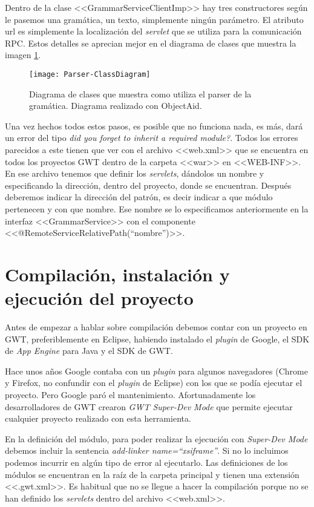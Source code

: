 Dentro de la clase <<GrammarServiceClientImp>> hay tres constructores según le pasemos una gramática, un texto, simplemente ningún parámetro. El atributo url es simplemente la localización del \emph{servlet} que se utiliza para la comunicación RPC. Estos detalles se aprecian mejor en el diagrama de clases que muestra la imagen \ref{fig:5.3}.

\begin{figure}
\centering
\texttt{[image: Parser-ClassDiagram]}
\caption{Diagrama de clases que muestra como utiliza el parser de la gramática. Diagrama realizado con ObjectAid.}
\label{fig:5.3}
\end{figure}

Una vez hechos todos estos pasos, es posible que no funciona nada, es más, dará un error del tipo \textit{\emph{did you forget to inherit a required module?}}. Todos los errores parecidos a este tienen que ver con el archivo <<web.xml>> que se encuentra en todos los proyectos GWT dentro de la carpeta <<war>> en <<WEB-INF>>. En ese archivo tenemos que definir los \emph{servlets}, dándolos un nombre y especificando la dirección, dentro del proyecto, donde se encuentran. Después deberemos indicar la dirección del patrón, es decir indicar a que módulo pertenecen y con que nombre. Ese nombre se lo especificamos anteriormente en la interfaz <<GrammarService>> con el componente <<@RemoteServiceRelativePath(``nombre'')>>.

\section{Compilación, instalación y ejecución del proyecto}

Antes de empezar a hablar sobre compilación debemos contar con un proyecto en GWT, preferiblemente en Eclipse, habiendo instalado el \emph{plugin} de Google, el SDK de \emph{App Engine} para Java y el SDK de GWT.

Hace unos años Google contaba con un \emph{plugin} para algunos navegadores (Chrome y Firefox, no confundir con el \emph{plugin} de Eclipse) con los que se podía ejecutar el proyecto. Pero Google paró el mantenimiento. Afortunadamente los desarrolladores de GWT crearon \emph{GWT Super-Dev Mode} que permite ejecutar cualquier proyecto realizado con esta herramienta.

En la definición del módulo, para poder realizar la ejecución con \emph{Super-Dev Mode} debemos incluir la sentencia \textit{add-linker name=``xsiframe''}. Si no lo incluimos podemos incurrir en algún tipo de error al ejecutarlo.
Las definiciones de los módulos se encuentran en la raíz de la carpeta principal y tienen una extensión <<.gwt.xml>>. Es habitual que no se llegue a hacer la compilación porque no se han definido los \emph{servlets} dentro del archivo <<web.xml>>.
  
